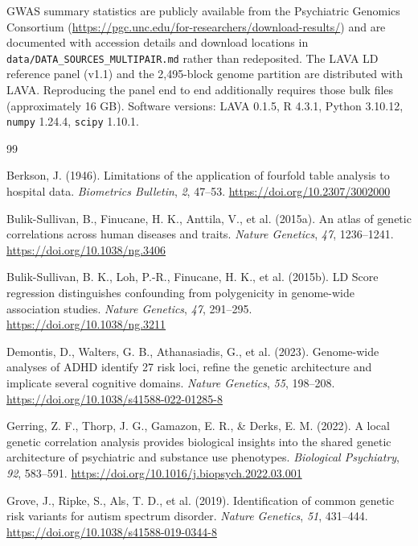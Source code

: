 \documentclass[12pt,a4paper]{article}
\begin{document}
GWAS summary statistics are publicly available from the Psychiatric Genomics Consortium
(\url{https://pgc.unc.edu/for-researchers/download-results/}) and are documented with
accession details and download locations in \texttt{data/DATA\_SOURCES\_MULTIPAIR.md}
rather than redeposited. The LAVA LD reference panel (v1.1) and the 2,495-block genome
partition are distributed with LAVA. Reproducing the panel end to end additionally
requires those bulk files (approximately 16 GB). Software versions: LAVA 0.1.5, R 4.3.1,
Python 3.10.12, \texttt{numpy} 1.24.4, \texttt{scipy} 1.10.1.




\begin{thebibliography}{99}

Berkson, J. (1946). Limitations of the application of fourfold table analysis to hospital data. \emph{Biometrics Bulletin}, \emph{2}, 47--53. \url{https://doi.org/10.2307/3002000}

Bulik-Sullivan, B., Finucane, H. K., Anttila, V., et al. (2015a). An atlas of genetic correlations across human diseases and traits. \emph{Nature Genetics}, \emph{47}, 1236--1241. \url{https://doi.org/10.1038/ng.3406}

Bulik-Sullivan, B. K., Loh, P.-R., Finucane, H. K., et al. (2015b). LD Score regression distinguishes confounding from polygenicity in genome-wide association studies. \emph{Nature Genetics}, \emph{47}, 291--295. \url{https://doi.org/10.1038/ng.3211}

Demontis, D., Walters, G. B., Athanasiadis, G., et al. (2023). Genome-wide analyses of ADHD identify 27 risk loci, refine the genetic architecture and implicate several cognitive domains. \emph{Nature Genetics}, \emph{55}, 198--208. \url{https://doi.org/10.1038/s41588-022-01285-8}

Gerring, Z. F., Thorp, J. G., Gamazon, E. R., \& Derks, E. M. (2022). A local genetic correlation analysis provides biological insights into the shared genetic architecture of psychiatric and substance use phenotypes. \emph{Biological Psychiatry}, \emph{92}, 583--591. \url{https://doi.org/10.1016/j.biopsych.2022.03.001}

Grove, J., Ripke, S., Als, T. D., et al. (2019). Identification of common genetic risk variants for autism spectrum disorder. \emph{Nature Genetics}, \emph{51}, 431--444. \url{https://doi.org/10.1038/s41588-019-0344-8}


\end{thebibliography}
\end{document}
